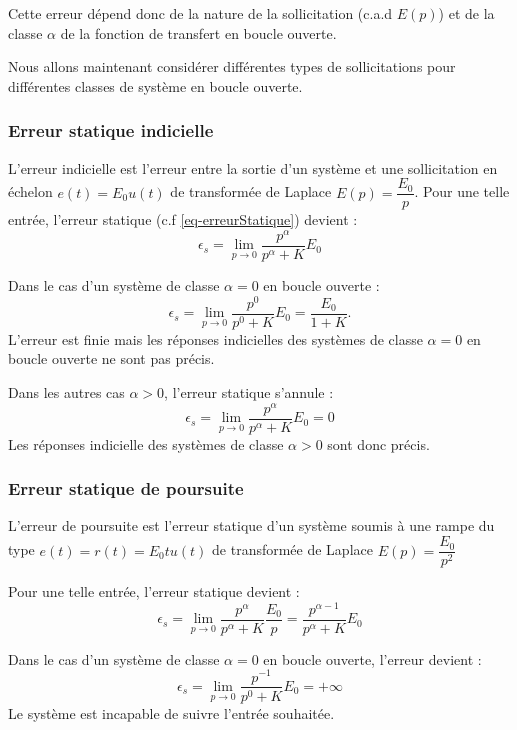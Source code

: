 Cette erreur dépend donc de la nature de la sollicitation (c.a.d $E(p)$) et 
de la classe $\alpha$ de la fonction de transfert en boucle ouverte.

Nous allons maintenant considérer différentes types de sollicitations pour 
différentes classes de système en boucle ouverte.

\subsubsection{Erreur statique indicielle}

L'erreur indicielle est l'erreur entre la sortie d'un système et une 
sollicitation en échelon $e(t)=E_0u(t)$ de transformée de Laplace 
$E(p)=\dfrac{E_0}{p}$. 
Pour une telle entrée, l'erreur statique (c.f \cref{eq-erreurStatique}) 
devient :
$$
\epsilon_s=\lim\limits_{p\to 0} \dfrac{p^\alpha}{p^\alpha+K}E_0
$$

Dans le cas d'un système de classe $\alpha=0$ en boucle ouverte :
$$
\epsilon_s=\lim\limits_{p\to 0} \dfrac{p^0}{p^0+K}E_0=\dfrac{E_0}{1+K}.
$$
L'erreur est finie mais les réponses indicielles des systèmes de classe 
$\alpha=0$ en boucle ouverte ne sont pas précis.

Dans les autres cas $\alpha>0$, l'erreur statique s'annule :
$$
\epsilon_s=\lim\limits_{p\to 0} \dfrac{p^\alpha}{p^\alpha+K}E_0=0
$$
Les réponses indicielle des systèmes de classe $\alpha>0$ sont donc précis.

\subsubsection{Erreur statique de poursuite}
L'erreur de poursuite est l'erreur statique d'un système soumis à une rampe 
du type $e(t)=r(t)=E_0t u(t)$
de transformée de Laplace $E(p)=\dfrac{E_0}{p^2}$

Pour une telle entrée, l'erreur statique devient :
$$
\epsilon_s=\lim\limits_{p\to 0} \dfrac{p^\alpha}{p^\alpha+K}\dfrac{E_0}{p}
          =\dfrac{p^{\alpha-1}}{p^\alpha+K}E_0 
$$

Dans le cas d'un système de classe $\alpha=0$ en boucle ouverte, 
l'erreur devient :
$$
\epsilon_s=\lim\limits_{p\to 0}\dfrac{p^{-1}}{p^0+K}E_0=+\infty
$$
Le système est incapable de suivre l'entrée souhaitée.

